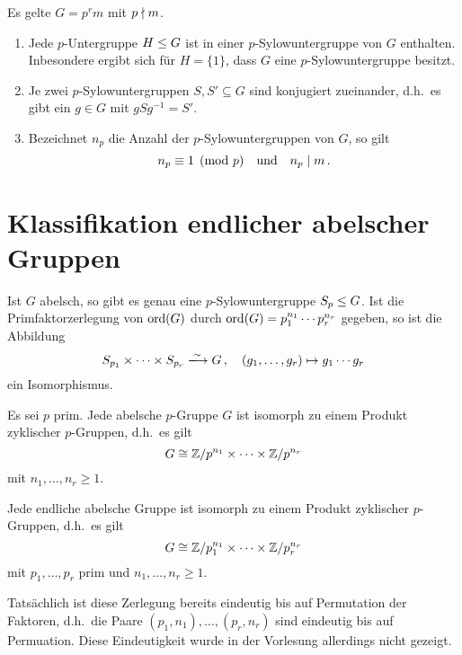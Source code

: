 \begin{theorem}[Sylowsätze]
  Es gelte $G = p^r m$ mit $p \mathrel{\nmid} m$.
  \begin{enumerate}
    \item
      Jede $p$-Untergruppe $H \mathrel{\leq} G$ ist in einer $p$-Sylowuntergruppe von $G$ enthalten.
      Inbesondere ergibt sich für $H = \{1\}$, dass $G$ eine $p$-Sylowuntergruppe besitzt.
    \item
      Je zwei $p$-Sylowuntergruppen $S, S' \subseteq G$ sind konjugiert zueinander, d.h.\ es gibt ein $g \in G$ mit $g S g^{-1} = S'$.
    \item
      Bezeichnet $n_p$ die Anzahl der $p$-Sylowuntergruppen von $G$, so gilt
      \[
                n_p
        \equiv  1
        \pmod{p}
        \quad\text{und}\quad
        n_p \mathrel{|} m \,.
      \]

  \end{enumerate}
\end{theorem}



\section{Klassifikation endlicher abelscher Gruppen}

\begin{theorem}
  Ist $G$ abelsch, so gibt es genau eine $p$-Sylowuntergruppe $S_p \mathrel{\leq} G$.
  Ist die Primfaktorzerlegung von $\operatorname{ord}(G)$ durch $\operatorname{ord}(G) = p_1^{n_1} \dotsm p_r^{n_r}$ gegeben, so ist die Abbildung
  \[
                            S_{p_1} \times \dotsb \times S_{p_r}
    \xlongrightarrow{\sim}  G \,,
    \quad                   (g_1, \dotsc, g_r)
    \mapsto                 g_1 \dotsm g_r
  \]
  ein Isomorphismus.
\end{theorem}

\begin{proposition}
  Es sei $p$ prim.
  Jede abelsche $p$-Gruppe $G$ ist isomorph zu einem Produkt zyklischer $p$-Gruppen, d.h.\ es gilt
  \[
          G
    \cong \mathbb{Z}/p^{n_1} \times \dotsm \times \mathbb{Z}/p^{n_r}
  \]
  mit $n_1, \dotsc, n_r \geq 1$.
\end{proposition}

\begin{corollary}
  Jede endliche abelsche Gruppe ist isomorph zu einem Produkt zyklischer $p$-Gruppen, d.h.\ es gilt
  \[
          G
    \cong \mathbb{Z}/p_1^{n_1} \times \dotsm \times \mathbb{Z}/p_r^{n_r}
  \]
  mit $p_1, \dotsc, p_r$ prim und $n_1, \dotsc, n_r \geq 1$.
\end{corollary}

\begin{remark}
  Tatsächlich ist diese Zerlegung bereits eindeutig bis auf Permutation der Faktoren, d.h.\ die Paare $(p_1, n_1), \dotsc, (p_r, n_r)$ sind eindeutig bis auf Permuation.
  Diese Eindeutigkeit wurde in der Vorlesung allerdings nicht gezeigt.
\end{remark}




